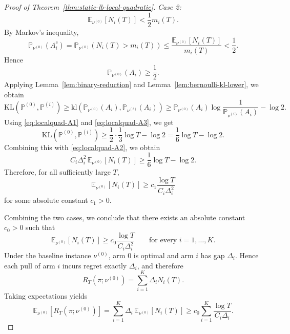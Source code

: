 \documentclass[
  12pt]{article}
\begin{document}
\begin{proof}[Proof of Theorem~\ref{thm:static-lb-local-quadratic}]
\medskip
\noindent
\textit{Case 2:}
\[
\mathbb E_{\nu^{(0)}}[N_i(T)]< \frac12 m_i(T).
\]
By Markov's inequality,
\[
\mathbb P_{\nu^{(0)}}(A_i^c)
=
\mathbb P_{\nu^{(0)}}(N_i(T)>m_i(T))
\le
\frac{\mathbb E_{\nu^{(0)}}[N_i(T)]}{m_i(T)}
<
\frac12.
\]
Hence
\begin{equation}
\mathbb P_{\nu^{(0)}}(A_i)\ge \frac12.
\label{eq:localquad-A3}
\end{equation}
Applying Lemma~\ref{lem:binary-reduction} and
Lemma~\ref{lem:bernoulli-kl-lower}, we obtain
\[
\mathrm{KL}(\mathbb P^{(0)},\mathbb P^{(i)})
\ge
\mathrm{kl}\left(\mathbb P_{\nu^{(0)}}(A_i),\mathbb P_{\nu^{(i)}}(A_i)\right)
\ge
\mathbb P_{\nu^{(0)}}(A_i)\log\frac{1}{\mathbb P_{\nu^{(i)}}(A_i)}-\log 2.
\]
Using \eqref{eq:localquad-A1} and \eqref{eq:localquad-A3}, we get
\[
\mathrm{KL}(\mathbb P^{(0)},\mathbb P^{(i)})
\ge
\frac12\cdot \frac13 \log T-\log 2
=
\frac16\log T-\log 2.
\]
Combining this with \eqref{eq:localquad-A2}, we obtain
\[
C_i\Delta_i^2\,\mathbb E_{\nu^{(0)}}[N_i(T)]
\ge
\frac16\log T-\log 2.
\]
Therefore, for all sufficiently large $T$,
\[
\mathbb E_{\nu^{(0)}}[N_i(T)]
\ge
c_1\frac{\log T}{C_i\Delta_i^2}
\]
for some absolute constant $c_1>0$.

\medskip

Combining the two cases, we conclude that there exists an absolute constant
$c_0>0$ such that
\[
\mathbb E_{\nu^{(0)}}[N_i(T)]
\ge
c_0\frac{\log T}{C_i\Delta_i^2}
\qquad
\text{for every }i=1,\dots,K.
\]
Under the baseline instance $\nu^{(0)}$, arm $0$ is optimal and arm $i$ has
gap $\Delta_i$. Hence each pull of arm $i$ incurs regret exactly $\Delta_i$,
and therefore
\[
R_T(\pi;\nu^{(0)})
=
\sum_{i=1}^K \Delta_i N_i(T).
\]
Taking expectations yields
\[
\mathbb E_{\nu^{(0)}}[R_T(\pi;\nu^{(0)})]
=
\sum_{i=1}^K \Delta_i\,\mathbb E_{\nu^{(0)}}[N_i(T)]
\ge
c_0\sum_{i=1}^K \frac{\log T}{C_i\Delta_i}.
\]
\end{proof}
\end{document}
